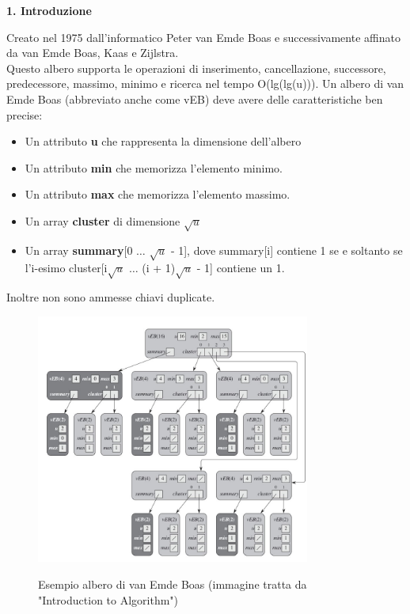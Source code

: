 \documentclass{article}
\begin{document}
\begin{flushleft}
\huge \textbf{1. Introduzione}
\newline
\newline
\normalsize
    
    Creato nel 1975 dall'informatico Peter van Emde Boas e successivamente affinato da van Emde Boas, Kaas e Zijlstra.\\
    Questo albero supporta le operazioni di inserimento, cancellazione, successore, predecessore, massimo, minimo e ricerca nel tempo O(lg(lg(u))).
    Un albero di van Emde Boas (abbreviato anche come vEB) deve avere delle caratteristiche ben precise:
    \begin{itemize}
        \item Un attributo \textbf{u} che rappresenta la dimensione dell'albero
        \item Un attributo \textbf{min} che memorizza l'elemento minimo.
        \item Un attributo \textbf{max} che memorizza l'elemento massimo.
        \item Un array \textbf{cluster} di dimensione $\sqrt{u}$
        \item Un array \textbf{summary}[0 $\dots$ $\sqrt{u}$ - 1], dove summary[i] contiene 1 se e soltanto se l'i-esimo cluster[i$\sqrt{u}$ $\dots$ (i + 1)$\sqrt{u}$ - 1] contiene un 1.
    \end{itemize}
    Inoltre non sono ammesse chiavi duplicate.\\
\end{flushleft}

\begin{figure}[h!]
    \begin{center}
    \includegraphics[width=9cm]{vEB.jpg}\\
    \caption{Esempio albero di van Emde Boas (immagine tratta da "Introduction to Algorithm")}
    \end{center}
\end{figure}
\end{document}
